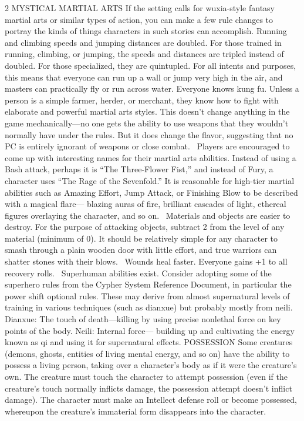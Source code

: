 \begin{multicols}{2}
MYSTICAL MARTIAL ARTS
If the setting calls for wuxia-style fantasy martial arts or similar types of action, you can make a few rule changes to portray the kinds of things characters in such stories can accomplish.
Running and climbing speeds and jumping distances are doubled. For those trained in running, climbing, or jumping, the speeds and distances are tripled instead of doubled. For those specialized, they are quintupled. For all intents and purposes, this means that everyone can run up a wall or jump very high in the air, and masters can practically fly or run across water.
Everyone knows kung fu. Unless a person is a simple farmer, herder, or merchant, they know how to fight with elaborate and powerful martial arts styles. This doesn’t change anything in the game mechanically—no one gets the ability to use weapons that they wouldn’t normally have under the rules. But it does change the flavor, suggesting that no PC is entirely ignorant of weapons or close combat. 
Players are encouraged to come up with interesting names for their martial arts abilities. Instead of using a Bash attack, perhaps it is “The Three-Flower Fist,” and instead of Fury, a character uses “The Rage of the Sevenfold.” It is reasonable for high-tier martial abilities such as Amazing Effort, Jump Attack, or Finishing Blow to be described with a magical flare— blazing auras of fire, brilliant cascades of light, ethereal figures overlaying the character, and so on. 
Materials and objects are easier to destroy. For the purpose of attacking objects, subtract 2 from the level of any material (minimum of 0). It should be relatively simple for any character to smash through a plain wooden door with little effort, and true warriors can shatter stones with their blows. 
Wounds heal faster. Everyone gains +1 to all recovery rolls. 
Superhuman abilities exist. Consider adopting some of the superhero rules from the Cypher System Reference Document, in particular the power shift optional rules. These may derive from almost supernatural levels of training in various techniques (such as dianxue) but probably mostly from neili.
Dianxue: The touch of death—killing by using precise nonlethal force on key points of the body. Neili: Internal force— building up and cultivating the energy known as qi and using it for supernatural effects.
POSSESSION
Some creatures (demons, ghosts, entities of living mental energy, and so on) have the ability to possess a living person, taking over a character’s body as if it were the creature’s own. The creature must touch the character to attempt possession (even if the creature’s touch normally inflicts damage, the possession attempt doesn’t inflict damage). The character must make an Intellect defense roll or become possessed, whereupon the creature’s immaterial form disappears into the character.

\end{multicols}
